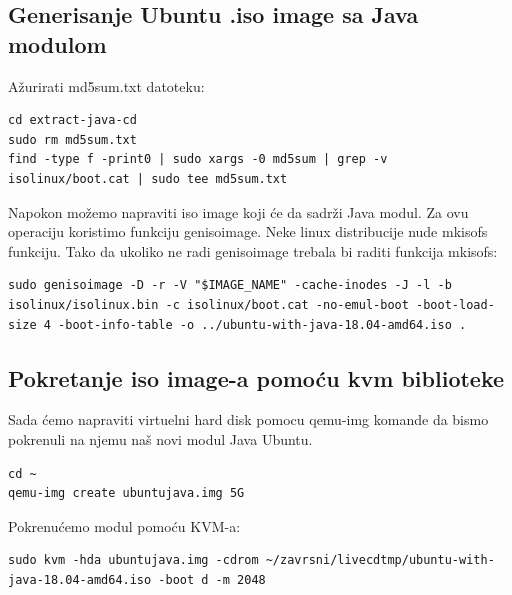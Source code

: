 \documentclass[12pt,vi]{mitthesis}
\begin{document}
\subsection*{Generisanje Ubuntu .iso image sa Java modulom}
\noindent
Ažurirati md5sum.txt datoteku:
\begin{lstlisting}[style=BashInputStyle]
cd extract-java-cd
sudo rm md5sum.txt
find -type f -print0 | sudo xargs -0 md5sum | grep -v isolinux/boot.cat | sudo tee md5sum.txt
\end{lstlisting}

\noindent
Napokon možemo napraviti iso image koji će da sadrži Java modul. Za ovu operaciju koristimo funkciju genisoimage. Neke linux distribucije nude mkisofs funkciju. Tako da ukoliko ne radi genisoimage trebala bi raditi funkcija mkisofs:
\begin{lstlisting}[style=BashInputStyle]
sudo genisoimage -D -r -V "$IMAGE_NAME" -cache-inodes -J -l -b isolinux/isolinux.bin -c isolinux/boot.cat -no-emul-boot -boot-load-size 4 -boot-info-table -o ../ubuntu-with-java-18.04-amd64.iso .
\end{lstlisting}

\subsection*{Pokretanje iso image-a pomoću kvm biblioteke}
\indent
Sada ćemo napraviti virtuelni hard disk pomocu qemu-img komande da bismo pokrenuli na njemu naš novi modul Java Ubuntu.
\begin{lstlisting}[style=BashInputStyle]
cd ~
qemu-img create ubuntujava.img 5G
\end{lstlisting}

\noindent 
Pokrenućemo modul pomoću KVM-a:
\begin{lstlisting}[style=BashInputStyle]
sudo kvm -hda ubuntujava.img -cdrom ~/zavrsni/livecdtmp/ubuntu-with-java-18.04-amd64.iso -boot d -m 2048
\end{lstlisting}
\end{document}
